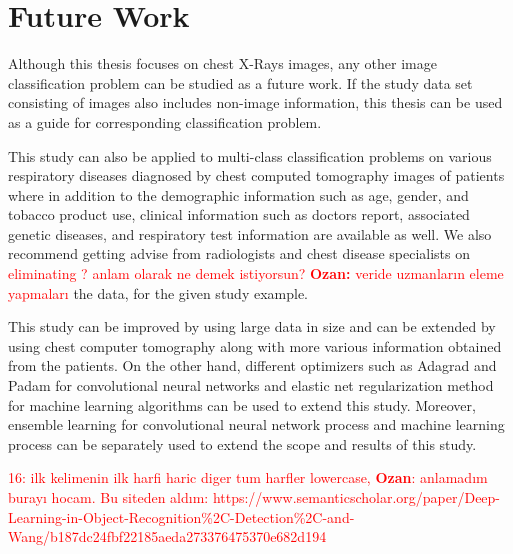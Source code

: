 \section{Future Work}

Although this thesis focuses on chest X-Rays images, any other image classification problem can be studied as a future work. If the study data set consisting of images also includes non-image information, this thesis can be used as a guide for corresponding classification problem.

This study can also be applied to multi-class classification problems on various respiratory diseases diagnosed by chest computed tomography images of patients where in addition to the demographic information such as age, gender, and tobacco product use, clinical information such as doctors report,  associated genetic diseases, and respiratory test information are available as well. We also recommend getting advise from radiologists and chest disease specialists on \textcolor{red}{eliminating ? anlam olarak ne demek istiyorsun? \textbf{Ozan:} veride uzmanların eleme yapmaları} the data, for the given study example.

This study can be improved by using large data in size and can be extended by using chest computer tomography along with more various information obtained from the patients. On the other hand, different optimizers such as Adagrad \cite{adagrad} and Padam \cite{padam} for convolutional neural networks and elastic net regularization method \cite{elasticnet_paper} for machine learning algorithms can be used to extend this study. Moreover, ensemble learning \cite{ensemble_learning} for convolutional neural network process and machine learning process can be separately used to extend the scope and results of this study. 

\textcolor{red}{16: ilk kelimenin ilk harfi haric diger tum harfler lowercase, \textbf{Ozan}: anlamadım burayı hocam. Bu siteden aldım: https://www.semanticscholar.org/paper/Deep-Learning-in-Object-Recognition\%2C-Detection\%2C-and-Wang/b187dc24fbf22185aeda273376475370e682d194}
